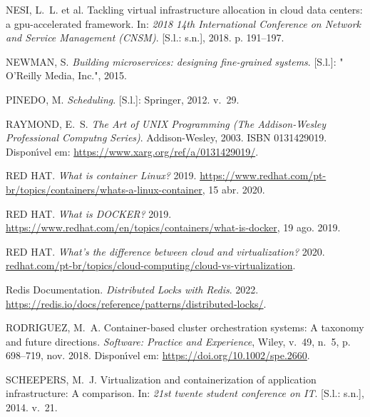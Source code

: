 \documentclass[
	12pt,				%
	openright,			%
	oneside,			%
	a4paper,			%
	brazil				%
	]{abntex2}
\begin{document}
\begin{thebibliography}{}
{NESI, L.~L. et al. Tackling virtual infrastructure allocation in cloud data
  centers: a gpu-accelerated framework. In:  \emph{2018 14th International
  Conference on Network and Service Management (CNSM)}. [S.l.: s.n.], 2018. p.
  191--197.}

{NEWMAN, S. \emph{Building microservices: designing fine-grained systems}.
  [S.l.]: " O'Reilly Media, Inc.", 2015.}

{PINEDO, M. \emph{Scheduling}. [S.l.]: Springer, 2012. v.~29.}

{RAYMOND, E.~S. \emph{The Art of UNIX Programming (The Addison-Wesley
  Professional Computng Series)}. Addison-Wesley, 2003.
ISBN 0131429019. Dispon{\'\i}vel em:
  \url{https://www.xarg.org/ref/a/0131429019/}.}

{{RED HAT}. \emph{What is container Linux?} 2019.
\url{https://www.redhat.com/pt-br/topics/containers/whats-a-linux-container},
  15 abr. 2020.}

{{RED HAT}. \emph{What is DOCKER?} 2019.
\url{https://www.redhat.com/en/topics/containers/what-is-docker}, 19 ago.
  2019.}

{{RED HAT}. \emph{What's the difference between cloud and virtualization?}
  2020.
\url{redhat.com/pt-br/topics/cloud-computing/cloud-vs-virtualization}.}

{{Redis Documentation}. \emph{Distributed Locks with Redis}. 2022.
\url{https://redis.io/docs/reference/patterns/distributed-locks/}.}

{RODRIGUEZ, M.~A. Container-based cluster orchestration systems: A taxonomy and
  future directions.
\emph{Software: Practice and Experience}, Wiley, v.~49, n.~5, p. 698--719, nov.
  2018.
Dispon{\'\i}vel em: \url{https://doi.org/10.1002/spe.2660}.}

{SCHEEPERS, M.~J. Virtualization and containerization of application
  infrastructure: A comparison. In:  \emph{21st twente student conference on
  IT}. [S.l.: s.n.], 2014. v.~21.}


\end{thebibliography}
\end{document}
